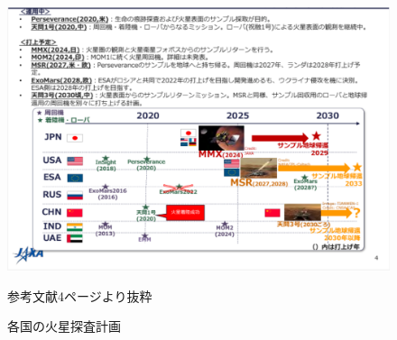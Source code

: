 \begin{figure}[tbh]
    \centering
    \includegraphics[width=0.7\textheight]{img/mars_explorations.pdf}
    \caption{各国の火星探査計画}
    \label{fig:mars_explorations}
    \begin{minipage}{\textwidth}
        \centering
        参考文献\cite{isas2023}4ページより抜粋
    \end{minipage}
\end{figure}

